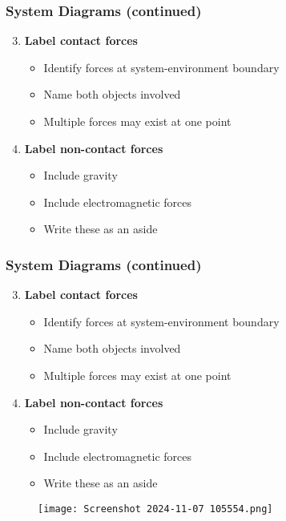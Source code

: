 \documentclass{beamer}
\begin{document}
\begin{frame}
\frametitle{System Diagrams (continued)}
\begin{enumerate}\setcounter{enumi}{2}
    \item \textbf{Label contact forces}
    \begin{itemize}
        \item Identify forces at system-environment boundary
        \item Name both objects involved
        \item Multiple forces may exist at one point
    \end{itemize}
    \item \textbf{Label non-contact forces}
    \begin{itemize}
        \item Include gravity
        \item Include electromagnetic forces
        \item Write these as an aside
    \end{itemize}
\end{enumerate}

\end{frame}

\begin{frame}
\frametitle{System Diagrams (continued)}
\begin{enumerate}\setcounter{enumi}{2}
    \item \textbf{Label contact forces}
    \begin{itemize}
        \item Identify forces at system-environment boundary
        \item Name both objects involved
        \item Multiple forces may exist at one point
    \end{itemize}
    \item \textbf{Label non-contact forces}
    \begin{itemize}
        \item Include gravity
        \item Include electromagnetic forces
        \item Write these as an aside
    \end{itemize}
\end{enumerate}
\begin{figure}[H]
    \centering
    \texttt{[image: Screenshot 2024-11-07 105554.png]}
\end{figure}
\end{frame}
\end{document}
